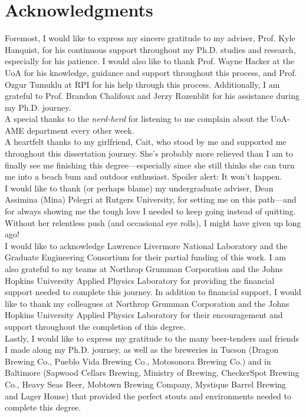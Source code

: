 \chapter*{Acknowledgments}
Foremost, I would like to express my sincere gratitude to my adviser, Prof.
Kyle Hanquist, for his continuous support throughout my Ph.D. studies and
research, especially for his patience. I would also like to thank Prof. Wayne
Hacker at the UoA for his knowledge, guidance and support throughout this process, and
Prof. Ozgur Tumuklu at RPI for his help through this process. Additionally, I
am grateful to Prof. Brandon Chalifoux and Jerzy Rozenblit for his assistance during my Ph.D. journey. \\ 

A special thanks to the \textit{nerd-herd} for listening to me complain about
the UoA-AME department every other week. \\ 

A heartfelt thanks to my girlfriend, Cait, who stood by me and supported me
throughout this dissertation journey. She’s probably more relieved than I am to
finally see me finishing this degree—especially since she still thinks she can
turn me into a beach bum and outdoor enthusiast. Spoiler alert: It won't happen. \\

I would like to thank (or perhaps blame) my undergraduate adviser, Dean
Assimina (Mina) Pelegri at Rutgers University, for setting me on this path—and
for always showing me the tough love I needed to keep going instead of
quitting. Without her relentless push (and occasional eye rolls), I might have
given up long ago! \\

I would like to acknowledge Lawrence Livermore National Laboratory and the
Graduate Engineering Consortium for their partial funding of this
work. I am also grateful to my teams at Northrop Grumman Corporation and the
Johns Hopkins University Applied Physics Laboratory for providing the financial
support needed to complete this journey. In addition to financial support, I
would like to thank my colleagues at Northrop Grumman Corporation and the Johns
Hopkins University Applied Physics Laboratory for their encouragement and
support throughout the completion of this degree.\\

Lastly, I would like to express my gratitude to the many beer-tenders and
friends I made along my Ph.D. journey, as well as the breweries in Tucson
(Dragon Brewing Co., Pueblo Vida Brewing Co., Motosonora Brewing Co.) and in
Baltimore (Sapwood Cellars Brewing, Ministry of Brewing, CheckerSpot Brewing
Co., Heavy Seas Beer, Mobtown Brewing Company, Mystique Barrel Brewing and
Lager House) that provided the perfect stouts
and environments needed to complete this degree. 
